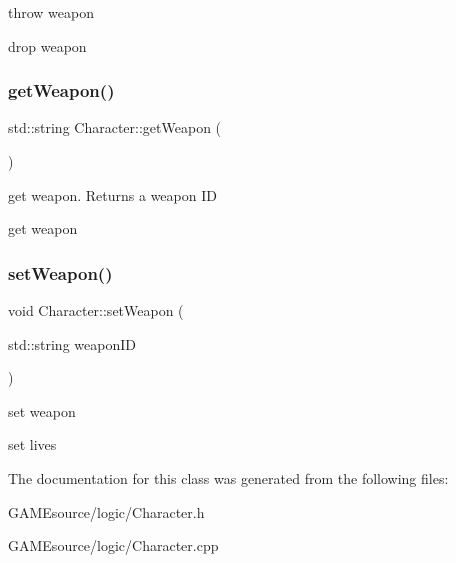 throw weapon 

drop weapon \mbox{\label{class_character_aaaa94fe3ab4da7641c7e50ca3a9896d4}} 
\subsubsection{\texorpdfstring{get\+Weapon()}{getWeapon()}}
{\footnotesize\ttfamily std\+::string Character\+::get\+Weapon (\begin{DoxyParamCaption}{ }\end{DoxyParamCaption})}



get weapon. Returns a weapon ID 

get weapon \mbox{\label{class_character_a2f2e942630667cc24ec25e36bde9b1aa}} 
\subsubsection{\texorpdfstring{set\+Weapon()}{setWeapon()}}
{\footnotesize\ttfamily void Character\+::set\+Weapon (\begin{DoxyParamCaption}\item[{std\+::string}]{weapon\+ID }\end{DoxyParamCaption})}



set weapon 

set lives 

The documentation for this class was generated from the following files\+:\begin{DoxyCompactItemize}
\item 
G\+A\+M\+Esource/logic/Character.\+h\item 
G\+A\+M\+Esource/logic/Character.\+cpp\end{DoxyCompactItemize}
